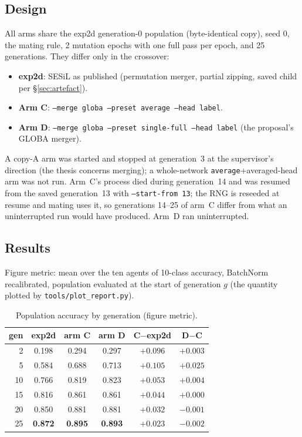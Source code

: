 \documentclass[11pt,a4paper]{article}
\newcommand{\code}[1]{\texttt{#1}}
\begin{document}
\subsection{Design}
All arms share the exp2d generation-0 population (byte-identical copy), seed 0, the mating rule, 2 mutation epochs with one full pass per epoch, and 25 generations. They differ only in the crossover:
\begin{itemize}[nosep]
\item \textbf{exp2d}: SESiL as published (permutation merger, partial zipping, saved child per \S\ref{sec:artefact}).
\item \textbf{Arm C}: \code{--merge globa --preset average --head label}.
\item \textbf{Arm D}: \code{--merge globa --preset single-full --head label} (the proposal's GLOBA merger).
\end{itemize}
A copy-A arm was started and stopped at generation~3 at the supervisor's direction (the thesis concerns merging); a whole-network \code{average}+averaged-head arm was not run. Arm~C's process died during generation~14 and was resumed from the saved generation~13 with \code{--start-from 13}; the RNG is reseeded at resume and mating uses it, so generations 14--25 of arm~C differ from what an uninterrupted run would have produced. Arm~D ran uninterrupted.

\subsection{Results}
Figure metric: mean over the ten agents of 10-class accuracy, BatchNorm recalibrated, population evaluated at the start of generation $g$ (the quantity plotted by \code{tools/plot\_report.py}).
\begin{table}[h]
\centering\small
\caption{Population accuracy by generation (figure metric).}
\label{tab:phase4}
\begin{tabular}{rccccc}
\toprule
gen & exp2d & arm C & arm D & C$-$exp2d & D$-$C \\
\midrule
2  & 0.198 & 0.294 & 0.297 & $+0.096$ & $+0.003$ \\
5  & 0.584 & 0.688 & 0.713 & $+0.105$ & $+0.025$ \\
10 & 0.766 & 0.819 & 0.823 & $+0.053$ & $+0.004$ \\
15 & 0.816 & 0.861 & 0.861 & $+0.044$ & $+0.000$ \\
20 & 0.850 & 0.881 & 0.881 & $+0.032$ & $-0.001$ \\
25 & \textbf{0.872} & \textbf{0.895} & \textbf{0.893} & $+0.023$ & $-0.002$ \\
\bottomrule
\end{tabular}
\end{table}
\end{document}
